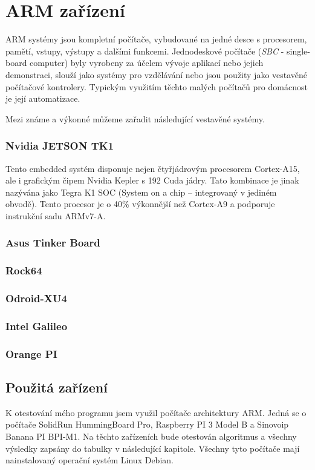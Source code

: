 \section{ARM zařízení}
ARM systémy jsou kompletní počítače, vybudované na jedné desce s procesorem, pamětí, vstupy, výstupy a dalšími funkcemi. Jednodeskové počítače (\textit{SBC} - single-board computer) byly vyrobeny za účelem vývoje aplikací nebo jejich demonstraci, slouží jako systémy pro vzdělávání nebo jsou použity jako vestavěné počítačové kontrolery. Typickým využitím těchto malých počítačů pro domácnost je její automatizace. 

Mezi známe a výkonné  můžeme zařadit následující vestavěné systémy.

\subsubsection*{Nvidia JETSON TK1}
Tento embedded systém disponuje nejen čtyřjádrovým procesorem Cortex-A15, ale i grafickým čipem Nvidia Kepler s 192 Cuda jádry. Tato kombinace je jinak nazývána jako  Tegra K1 SOC (System on a chip – integrovaný v jediném obvodě). Tento procesor je o 40\% výkonnější než Cortex-A9 a podporuje instrukční sadu ARMv7-A.

\subsubsection*{Asus Tinker Board}


\subsubsection*{Rock64}


\subsubsection*{Odroid-XU4}


\subsubsection*{Intel Galileo}


\subsubsection*{Orange PI}

\subsection{Použitá zařízení}
K otestování mého programu jsem využil počítače architektury ARM. Jedná se o počítače SolidRun HummingBoard Pro, Raspberry PI 3 Model B a Sinovoip Banana PI BPI-M1. Na těchto zařízeních bude otestován algoritmus a všechny výsledky zapsány do tabulky v následující kapitole. Všechny tyto počítače mají nainstalovaný operační systém Linux Debian.

